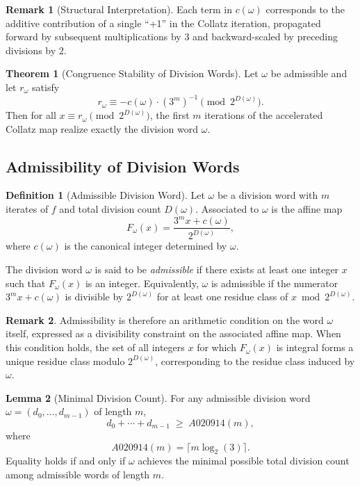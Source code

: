 \documentclass[12pt, oneside]{article}   	%
\numberwithin{equation}{section}          %
\theoremstyle{definition}
\newtheorem{define}{Definition}[section]
\newtheorem{theorem}{Theorem}
\newtheorem{lemma}[theorem]{Lemma}
\newtheorem*{remark}{Remark}
\begin{document}
\begin{remark}[Structural Interpretation]
Each term in $c(\omega)$ corresponds to the additive contribution of a single
``+1'' in the Collatz iteration, propagated forward by subsequent multiplications
by $3$ and backward-scaled by preceding divisions by $2$.
\end{remark}

\begin{theorem}[Congruence Stability of Division Words]
Let $\omega$ be admissible and let $r_\omega$ satisfy
\[
r_\omega \equiv -c(\omega)\cdot (3^m)^{-1} \pmod{2^{D(\omega)}}.
\]
Then for all $x \equiv r_\omega \pmod{2^{D(\omega)}}$, the first $m$
iterations of the accelerated Collatz map realize exactly the division word $\omega$.
\end{theorem}

\subsection{Admissibility of Division Words}

\begin{define}[Admissible Division Word]
\label{def:admissible-division-word}
Let \(\omega\) be a division word with $m$ iterates of $f$ and total division count
$D(\omega)$. Associated to $\omega$ is the affine map
\[
F_\omega(x) = \frac{3^m x + c(\omega)}{2^{D(\omega)}},
\]
where $c(\omega)$ is the canonical integer determined by $\omega$.

The division word $\omega$ is said to be \emph{admissible} if there exists at
least one integer $x$ such that $F_\omega(x)$ is an integer. Equivalently,
$\omega$ is admissible if the numerator $3^m x + c(\omega)$ is divisible by
$2^{D(\omega)}$ for at least one residue class of $x \bmod 2^{D(\omega)}$.
\end{define}

\begin{remark}
Admissibility is therefore an arithmetic condition on the word $\omega$
itself, expressed as a divisibility constraint on the associated affine
map. When this condition holds, the set of all integers $x$ for which
$F_\omega(x)$ is integral forms a unique residue class modulo $2^{D(\omega)}$,
corresponding to the residue class induced by $\omega$.
\end{remark}

\begin{lemma}[Minimal Division Count]
For any admissible division word $\omega=(d_0,\dots,d_{m-1})$ of length $m$,
\[
d_0 + \cdots + d_{m-1} \;\ge\; A020914(m),
\]
where
\[
A020914(m) = \lceil m \log_2(3) \rceil.
\]
Equality holds if and only if $\omega$ achieves the minimal possible total
division count among admissible words of length $m$.
\end{lemma}
\end{document}
